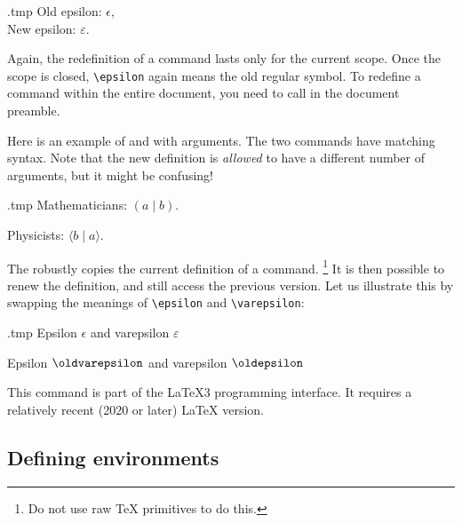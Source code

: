 \begin{VerbatimOut}{\jobname.tmp}
Old epsilon: $\epsilon$,\\
\renewcommand{\epsilon}{\varepsilon}
New epsilon: $\epsilon$.
\end{VerbatimOut}
\ShowExample
%
Again, the redefinition of a command lasts only for the current scope.
Once the scope is closed, \verb|\epsilon| again means the old regular symbol.
To redefine a command within the entire document,
you need to call  in the document preamble.

Here is an example of  and  with arguments.
The two commands have matching syntax.
Note that the new definition is \emph{allowed} to have a different number of arguments,
but it might be confusing!

\begin{VerbatimOut}{\jobname.tmp}
\newcommand{\dual}[2]{(#1 \mid #2)}
Mathematicians: $\dual{a}{b}$.

\renewcommand{\dual}[2]
  {\langle#2 \mid #1\rangle}
Physicists: $\dual{a}{b}$.
\end{VerbatimOut}
\ShowExample

The  robustly copies the current definition of a command.%
\footnote{Do not use raw \TeX{} primitives to do this.}
It is then possible to renew the definition, and still access the previous version.
Let us illustrate this by swapping the meanings of \verb|\epsilon| and \verb|\varepsilon|:
%
\begin{VerbatimOut}{\jobname.tmp}
Epsilon $\epsilon$ and varepsilon $\varepsilon$

\DeclareCommandCopy{\oldepsilon}{\epsilon}
\DeclareCommandCopy
    {\oldvarepsilon}{\varepsilon}
\renewcommand{\epsilon}{\oldvarepsilon}
\renewcommand{\varepsilon}{\oldepsilon}

Epsilon $\epsilon$ and varepsilon $\varepsilon$
\end{VerbatimOut}
\ShowExample

\begin{latexthree}
This command is part of the \LaTeX3 programming interface.
It requires a relatively recent (2020 or later) \LaTeX{} version.
\end{latexthree}


%
\subsection{Defining environments}

